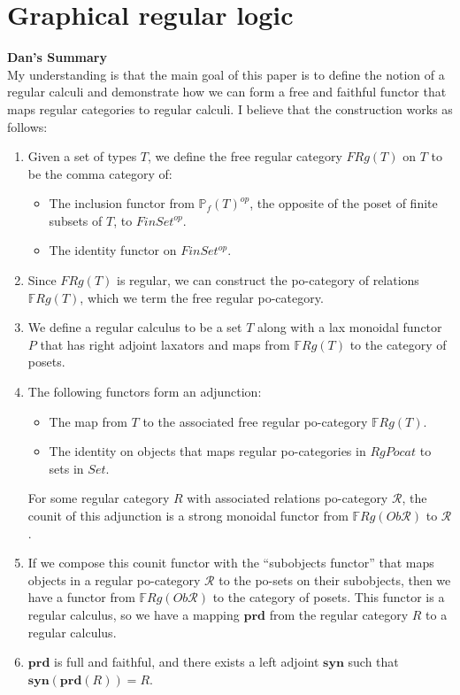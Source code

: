 \documentclass{amsart}
\begin{document}

\section{Graphical regular logic}
\label{sec:reg-logic}
\textbf{Dan's Summary}\\
My understanding is that the main goal of this paper is to define the notion of a regular calculi and demonstrate how we can form a free and faithful functor that maps regular categories to regular calculi. I believe that the construction works as follows:
\begin{enumerate}
  \item Given a set of types $T$, we define the free regular category $FRg(T)$ on $T$ to be the comma category of:
    \begin{itemize}
      \item The inclusion functor from $\mathbb{P}_f(T)^{op}$, the opposite of the poset of finite subsets of $T$, to $FinSet^{op}$.
      \item The identity functor on $FinSet^{op}$.
    \end{itemize}

  \item Since $FRg(T)$ is regular, we can construct the po-category of relations $\mathbb{F}Rg(T)$, which we term the free regular po-category.

  \item We define a regular calculus to be a set $T$ along with a lax monoidal functor $P$ that has right adjoint laxators and maps from $\mathbb{F}Rg(T)$ to the category of posets.

  \item The following functors form an adjunction:
    \begin{itemize}
      \item The map from $T$ to the associated free regular po-category $\mathbb{F}Rg(T)$.
      \item The identity on objects that maps regular po-categories in $RgPocat$ to sets in $Set$.
    \end{itemize}
   For some regular category $R$ with associated relations po-category $\mathcal{R}$, the counit of this adjunction is a strong monoidal functor from $\mathbb{F}Rg(Ob \mathcal{R})$ to $\mathcal{R}$.

  \item If we compose this counit functor with the ``subobjects functor'' that maps objects in a regular po-category $\mathcal{R}$ to the po-sets on their subobjects, then we have a functor from $\mathbb{F}Rg(Ob \mathcal{R})$ to the category of posets. This functor is a regular calculus, so we have a mapping $\textbf{prd}$ from the regular category $R$ to a regular calculus.

  \item $\textbf{prd}$ is full and faithful, and there exists a left adjoint $\textbf{syn}$ such that $\textbf{syn}(\textbf{prd}(R)) = R$.
\end{enumerate}
\end{document}
